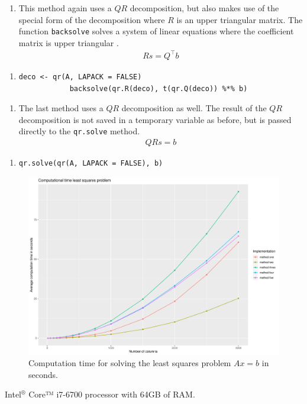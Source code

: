 \begin{enumerate}[resume*=quest]
	\item This method again uses a $QR$ decomposition, but also makes use of the special form of the decomposition where $R$ is an upper triangular matrix. The function \texttt{backsolve} solves a system of linear equations where the coefficient matrix is upper triangular \cite{R}.
	\begin{align*}
		Rs = Q^\top b
	\end{align*}
\end{enumerate}
\begin{enumerate}[resume*=inform]
	\item[] \begin{lstlisting}[otherkeywords={\%*\%, qr.R}, numbers=none]
			deco <- qr(A, LAPACK = FALSE)
			backsolve(qr.R(deco), t(qr.Q(deco)) %*% b)
			\end{lstlisting}
\end{enumerate}


\begin{enumerate}[resume*=quest]
	\item The last method uses a $QR$ decomposition as well. The result of the $QR$ decomposition is not saved in a temporary variable as before, but is passed directly to the \texttt{qr.solve} method. 	
	\begin{align*}
		QRs = b
	\end{align*}
\end{enumerate}
\begin{enumerate}[resume*=inform]
	\item[] \begin{lstlisting}[otherkeywords={\%*\%, qr.R}, numbers=none]
			qr.solve(qr(A, LAPACK = FALSE), b)
			\end{lstlisting}
\end{enumerate}



\begin{figure}
	\centering
	\includegraphics[width=\textwidth]{figures/chapter_NNLS/computation_time}
	\caption{Computation time for solving the least squares problem $Ax = b$ in seconds.}
	\label{fig:comp_time}
\end{figure}

Intel$^{®}$ Core™ i7-6700 processor with 64GB of RAM. 

